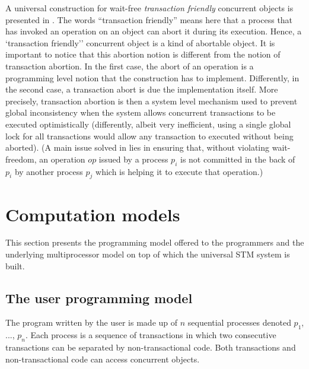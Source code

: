 A universal construction for wait-free {\it transaction friendly} 
concurrent objects is presented in \cite{CER10}. The words 
``transaction friendly'' means here that a process that has invoked an
operation on an object can abort it during its execution. Hence, 
a `transaction friendly'' concurrent object is a kind of  
abortable object.  It is important to notice  that  this  abortion 
notion is different from  the notion of  transaction abortion. 
In the first case, the abort of an operation is a programming level notion
that  the construction has to implement. 
Differently, in the second case,  a transaction abort is  due 
the implementation itself. More precisely, 
transaction abortion is then a system level mechanism used to  prevent  
global inconsistency when  the system allows concurrent transactions 
to be  executed
optimistically (differently, albeit very inefficient,  using a single 
global lock for  all transactions would allow any  transaction to executed
without being aborted).  (A main issue solved in  \cite{CER10}
lies in ensuring that, without violating wait-freedom,  an  operation $op$ 
issued by a process $p_i$  is not committed in the back of $p_i$ by another  
process $p_j$  which is  helping it to execute that  operation.) 
 






\section{Computation models}
\label{sec:models}

This section presents the programming model offered to the programmers
and  the underlying  multiprocessor model on top of which  the universal STM 
system is built. 



\subsection{The  user programming model}

The program written by the user is made up of $n$ sequential processes
denoted $p_1$, ..., $p_n$. Each process is a sequence of transactions 
in which two consecutive transactions can be separated by non-transactional 
code. Both transactions and  non-transactional code can access concurrent 
objects.

